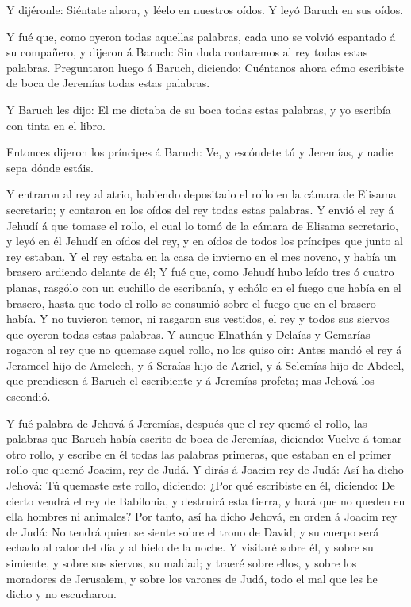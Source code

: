  Y dijéronle: Siéntate ahora, y léelo en nuestros oídos. Y
leyó Baruch en sus oídos.

 Y fué que, como oyeron todas aquellas palabras, cada uno
se volvió espantado á su compañero, y dijeron á Baruch: Sin duda
contaremos al rey todas estas palabras.  Preguntaron luego
á Baruch, diciendo: Cuéntanos ahora cómo escribiste de boca de Jeremías
todas estas palabras.

 Y Baruch les dijo: El me dictaba de su boca todas estas
palabras, y yo escribía con tinta en el libro.

 Entonces dijeron los príncipes á Baruch: Ve, y escóndete
tú y Jeremías, y nadie sepa dónde estáis.

 Y entraron al rey al atrio, habiendo depositado el rollo
en la cámara de Elisama secretario; y contaron en los oídos del rey
todas estas palabras.  Y envió el rey á Jehudí á que tomase
el rollo, el cual lo tomó de la cámara de Elisama secretario, y leyó en
él Jehudí en oídos del rey, y en oídos de todos los príncipes que junto
al rey estaban.  Y el rey estaba en la casa de invierno en
el mes noveno, y había un brasero ardiendo delante de él; 
Y fué que, como Jehudí hubo leído tres ó cuatro planas, rasgólo con un
cuchillo de escribanía, y echólo en el fuego que había en el brasero,
hasta que todo el rollo se consumió sobre el fuego que en el brasero
había.  Y no tuvieron temor, ni rasgaron sus vestidos, el
rey y todos sus siervos que oyeron todas estas palabras.  Y
aunque Elnathán y Delaías y Gemarías rogaron al rey que no quemase aquel
rollo, no los quiso oir:  Antes mandó el rey á Jerameel
hijo de Amelech, y á Seraías hijo de Azriel, y á Selemías hijo de
Abdeel, que prendiesen á Baruch el escribiente y á Jeremías profeta; mas
Jehová los escondió.

 Y fué palabra de Jehová á Jeremías, después que el rey
quemó el rollo, las palabras que Baruch había escrito de boca de
Jeremías, diciendo:  Vuelve á tomar otro rollo, y escribe
en él todas las palabras primeras, que estaban en el primer rollo que
quemó Joacim, rey de Judá.  Y dirás á Joacim rey de Judá:
Así ha dicho Jehová: Tú quemaste este rollo, diciendo: ¿Por qué
escribiste en él, diciendo: De cierto vendrá el rey de Babilonia, y
destruirá esta tierra, y hará que no queden en ella hombres ni animales?
 Por tanto, así ha dicho Jehová, en orden á Joacim rey de
Judá: No tendrá quien se siente sobre el trono de David; y su cuerpo
será echado al calor del día y al hielo de la noche.  Y
visitaré sobre él, y sobre su simiente, y sobre sus siervos, su maldad;
y traeré sobre ellos, y sobre los moradores de Jerusalem, y sobre los
varones de Judá, todo el mal que les he dicho y no escucharon.

